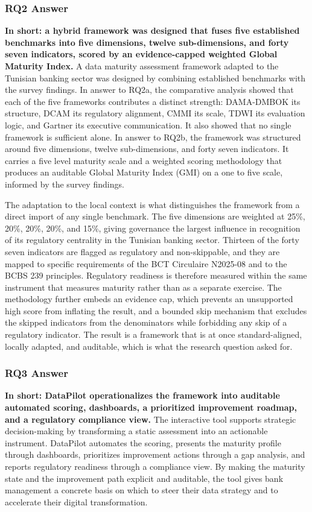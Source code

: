 \subsubsection{RQ2 Answer}

\textbf{In short: a hybrid framework was designed that fuses five established benchmarks into five dimensions, twelve sub-dimensions, and forty seven indicators, scored by an evidence-capped weighted Global Maturity Index.} A data maturity assessment framework adapted to the Tunisian banking sector was designed by combining established benchmarks with the survey findings. In answer to RQ2a, the comparative analysis showed that each of the five frameworks contributes a distinct strength: DAMA-DMBOK its structure, DCAM its regulatory alignment, CMMI its scale, TDWI its evaluation logic, and Gartner its executive communication. It also showed that no single framework is sufficient alone. In answer to RQ2b, the framework was structured around five dimensions, twelve sub-dimensions, and forty seven indicators. It carries a five level maturity scale and a weighted scoring methodology that produces an auditable Global Maturity Index (GMI) on a one to five scale, informed by the survey findings.

The adaptation to the local context is what distinguishes the framework from a direct import of any single benchmark. The five dimensions are weighted at 25\%, 20\%, 20\%, 20\%, and 15\%, giving governance the largest influence in recognition of its regulatory centrality in the Tunisian banking sector. Thirteen of the forty seven indicators are flagged as regulatory and non-skippable, and they are mapped to specific requirements of the BCT Circulaire N\textdegree{}2025-08 and to the BCBS 239 principles. Regulatory readiness is therefore measured within the same instrument that measures maturity rather than as a separate exercise. The methodology further embeds an evidence cap, which prevents an unsupported high score from inflating the result, and a bounded skip mechanism that excludes the skipped indicators from the denominators while forbidding any skip of a regulatory indicator. The result is a framework that is at once standard-aligned, locally adapted, and auditable, which is what the research question asked for.

\subsubsection{RQ3 Answer}

\textbf{In short: DataPilot operationalizes the framework into auditable automated scoring, dashboards, a prioritized improvement roadmap, and a regulatory compliance view.} The interactive tool supports strategic decision-making by transforming a static assessment into an actionable instrument. DataPilot automates the scoring, presents the maturity profile through dashboards, prioritizes improvement actions through a gap analysis, and reports regulatory readiness through a compliance view. By making the maturity state and the improvement path explicit and auditable, the tool gives bank management a concrete basis on which to steer their data strategy and to accelerate their digital transformation.

